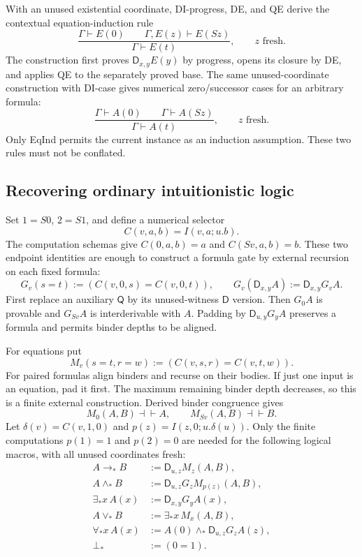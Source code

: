 \documentclass[11pt,letterpaper]{article}
\theoremstyle{definition}\newtheorem{definition}[theorem]{Definition}
\theoremstyle{remark}\newtheorem{remark}[theorem]{Remark}
\newcommand{\D}{\mathsf D}
\newcommand{\Q}{\mathsf Q}
\begin{document}
With an unused existential coordinate, DI-progress, DE, and QE derive
the contextual equation-induction rule
\[
 \frac{\Gamma\vdash E(0)\qquad\Gamma,E(z)\vdash E(Sz)}
      {\Gamma\vdash E(t)},
 \qquad z\text{ fresh}.
 \tag{EqInd}\label{eq:new-eqind}
\]
The construction first proves $\D_{x,y}E(y)$ by progress, opens its
closure by DE, and applies QE to the separately proved base. The
same unused-coordinate construction with DI-case gives numerical
zero/successor cases for an arbitrary formula:
\[
 \frac{\Gamma\vdash A(0)\qquad\Gamma\vdash A(Sz)}
      {\Gamma\vdash A(t)},
 \qquad z\text{ fresh}.
 \tag{Cases}\label{eq:new-cases}
\]
Only EqInd permits the current instance as an induction assumption.
These two rules must not be conflated.

\subsection{Recovering ordinary intuitionistic logic}

Set $1=S0$, $2=S1$, and define a numerical selector
\[
 C(v,a,b)=I(v,a;u.b).
\]
The computation schemas give $C(0,a,b)=a$ and $C(Sv,a,b)=b$.
These two endpoint identities are enough to construct a formula gate
by external recursion on each fixed formula:
\[
 G_v(s=t):=(C(v,0,s)=C(v,0,t)),\qquad
 G_v(\D_{x,y}A):=\D_{x,y}G_vA.
\]
First replace an auxiliary $\Q$ by its unused-witness $\D$ version.
Then $G_0A$ is provable and $G_{Sv}A$ is interderivable with $A$.
Padding by $\D_{u,y}G_yA$ preserves a formula and permits binder
depths to be aligned.

For equations put
\[
 M_v(s=t,r=w):=(C(v,s,r)=C(v,t,w)).
\]
For paired formulas align binders and recurse on their bodies. If just
one input is an equation, pad it first. The maximum remaining binder
depth decreases, so this is a finite external construction. Derived
binder congruence gives
\[
 M_0(A,B)\dashv\vdash A,\qquad M_{Sv}(A,B)\dashv\vdash B.
\]
Let $\delta(v)=C(v,1,0)$ and $p(z)=I(z,0;u.\delta(u))$.
Only the finite computations $p(1)=1$ and $p(2)=0$ are needed for
the following logical macros, with all unused coordinates fresh:
\begin{align*}
 A\to_*B&:=\D_{u,z}M_z(A,B),\\
 A\wedge_*B&:=\D_{u,z}G_zM_{p(z)}(A,B),\\
 \exists_*x\,A(x)&:=\D_{x,y}G_yA(x),\\
 A\vee_*B&:=\exists_*x\,M_x(A,B),\\
 \forall_*x\,A(x)&:=A(0)\wedge_*\D_{u,z}G_zA(z),\\
 \bot_*&:=(0=1).
\end{align*}
\end{document}
